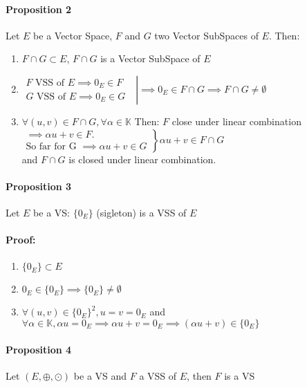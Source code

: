 \documentclass[notitlepage]{math}
\begin{document}
\paragraph{Proposition 2}
Let $E$ be a Vector Space, $F$ and $G$ two Vector SubSpaces of $E$. Then:\\
\begin{enumerate}
    \item $F \cap G \subset E$,    $F \cap G$ is a Vector SubSpace of $E$
    \item $\left.\begin{matrix}
        F \text{ VSS of }E \implies 0_E \in F \\
        G \text{ VSS of }E \implies 0_E \in G
    \end{matrix} \text{ } \right| \implies 0_E \in F \cap G \implies F \cap G \ne \emptyset$
    \item $\forall (u,v) \in F\cap G, \forall \alpha \in \mathbb{K}$ Then: $F$ close under linear combination
    \\ 
    $\left. \begin{matrix} \implies \alpha u + v \in F. \\ \text{So far for G }\implies \alpha u + v \in G  \end{matrix} \right\} \alpha u + v \in F\cap G $ \\ and $F\cap G$ is closed under linear combination.
\end{enumerate} 
\paragraph{Proposition 3}
Let $E$ be a VS: $\{0_E\}$ (sigleton) is a VSS of $E$
\paragraph{Proof:}
\begin{enumerate}
    \item $\{0_E\} \subset E$
    \item $0_E \in \{0_E\} \implies \{0_E\} \ne \emptyset $
    \item $ \forall (u,v) \in {\{0_E\}}^2, u = v = 0_E$ and $\forall \alpha \in \mathbb{K}, \alpha u = 0_E \implies \alpha u + v = 0_E \implies (\alpha u + v) \in \{0_E\}$
\end{enumerate}
\paragraph{Proposition 4}
Let $(E, \oplus , \odot)$ be a VS and $F$ a VSS of $E$, then $F$ is a VS
\end{document}
